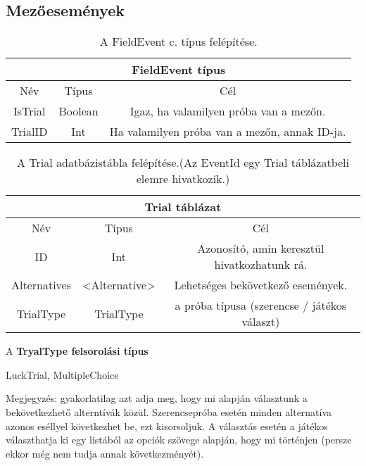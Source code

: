 \subsection{Mezőesemények}

\begin{table}[H]
	\centering
	\begin{tabular}{ |c|c|c| }
		\hline
		\multicolumn{3}{|c|}{FieldEvent típus}\\
		\hline
		Név & Típus & Cél \\
		\hline
		IsTrial  & Boolean  & Igaz, ha valamilyen próba van a mezőn.\\
		\hline
		TrialID & Int & Ha valamilyen próba van a mezőn, annak ID-ja.\\
		\hline
	\end{tabular}
	\caption[FieldEvent típus]{A FieldEvent c. típus felépítése.}
	\label{tab:field}
\end{table}


\begin{table}[htb]
	\centering
	\begin{tabular}{ |c|c|c| }
		\hline
		\multicolumn{3}{|c|}{Trial táblázat}\\
		\hline
		Név & Típus & Cél \\
		\hline
		ID & Int & Azonosító, amin keresztül hivatkozhatunk rá. \\
		\hline
		Alternatives & <Alternative> & Lehetséges bekövetkező események.\\
		\hline
		TrialType & TrialType & a próba típusa (szerencse / játékos választ)\\
		\hline
	\end{tabular}
	\caption[Trial adatbázistába]{A Trial adatbázistábla felépítése.(Az EventId egy Trial táblázatbeli elemre hivatkozik.)}
	\label{tab:trial}
\end{table}

A \textbf{TryalType felsorolási típus}
\begin{compactitem}
	\item LuckTrial, MultipleChoice
	\item Megjegyzés: gyakorlatilag azt adja meg, hogy mi alapján választunk a bekövetkezhető alterntívák közül. Szerencsepróba esetén minden alternatíva azonos eséllyel következhet be, ezt kisorsoljuk. A választás esetén a játékos választhatja ki egy listából az opciók szövege alapján, hogy mi történjen (persze ekkor még nem tudja annak következményét).
\end{compactitem}


